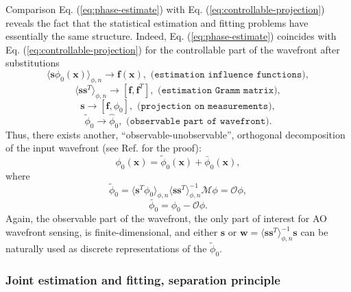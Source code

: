 Comparison Eq. (\ref{eq:phase-estimate}) with Eq.
(\ref{eq:controllable-projection}) reveals the fact that
the statistical estimation and fitting problems have essentially the same
structure. Indeed, Eq. (\ref{eq:phase-estimate}) coincides with Eq.
(\ref{eq:controllable-projection}) for the controllable part of the wavefront
after substitutions
$$
  \langle \bm{s} \phi_{0}(\bm{x}) \rangle_{\phi,n} \rightarrow
  \bm{f}(\bm{x}), \,\,
  \texttt{(estimation influence functions)},
$$
$$
  \langle \bm{s} \bm{s}^{T} \rangle_{\phi,n} \rightarrow [\bm{f},\bm{f}^{T}],
  \,\, \texttt{(estimation Gramm matrix)},
$$
$$
  \bm{s} \rightarrow [\bm{f},\phi_{0}], \,\,
  \texttt{(projection on measurements)},
$$
$$
  \tilde{\phi}_{0} \rightarrow \hat{\phi}_{0}, \,\,
  \texttt{(observable part of wavefront)}.
$$
Thus, there exists another, ``observable-unobservable'', orthogonal
decomposition of the input wavefront (see Ref. \cite{WibergMaxGavel2} for the
proof):
\begin{equation} \label{eq:observable-unobservable}
	\phi_{0} (\bm{x}) = \tilde{\phi}_{0} (\bm{x}) + \bar{\phi}_{0} (\bm{x}),
\end{equation}
where
\begin{equation} \label{eq:observable-projection}
	\tilde{\phi}_{0} = \langle \bm{s}^{T} \phi_{0} \rangle_{\phi,n}
	             \langle \bm{s} \bm{s}^{T} \rangle_{\phi,n}^{-1}
	             \mathcal{M} \phi = \mathcal{O} \phi,
\end{equation}
\begin{equation} \label{eq:unobservable-projection}
	\bar{\phi}_{0} = \phi_{0} - \mathcal{O} \phi.
\end{equation}
Again, the observable part of the wavefront, the only part of interest for AO
wavefront sensing, is finite-dimensional, and either $\bm{s}$ or
$\bm{w} = \langle \bm{s} \bm{s}^{T} \rangle_{\phi,n}^{-1} \bm{s}$ can be
naturally used as discrete representations of the $\tilde{\phi}_{0}$.

\subsubsection{Joint estimation and fitting, separation principle}

